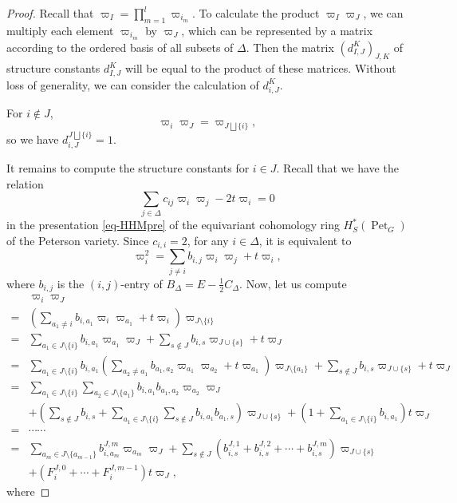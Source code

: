 \documentclass[11pt, letterpaper]{amsart}
\numberwithin{equation}{section}
\DeclareMathOperator{\Pet}{Pet}
\begin{document}
\begin{proof}
Recall that $\varpi_I=\prod_{m=1}^l\varpi_{i_m}$. To calculate the product $\varpi_I\varpi_J$, we can multiply each element $\varpi_{i_m}$ by $\varpi_J$, which can be represented by a matrix according to the ordered basis of all subsets of $\Delta$. Then the matrix $(d^K_{I, J})_{J, K}$ of structure constants $d_{I,J}^K$ will be equal to the product of these matrices. Without loss of generality, we can consider the calculation of $d_{i,J}^K$.

For $i\notin J$,
\[ \varpi_{i}\varpi_{J}=\varpi_{J\bigsqcup\{i\} },
    \]
so we have $d_{i,J}^{J\bigsqcup\{i\}}=1$.

    It remains to compute the structure constants for $i\in J$.
    Recall that we have the relation 
    $$\sum_{j\in \Delta}c_{ij}\varpi_i\varpi_j-2t\varpi_i=0$$ 
    in the presentation \eqref{eq-HHMpre} of the equivariant cohomology ring $H_S^*(\Pet_G)$ of the Peterson variety. Since $c_{i,i}=2$, for any $i\in \Delta$, it is equivalent to
    \[ \varpi_i^2=\sum_{j \neq i}b_{i,j} \varpi_i\varpi_j+t\varpi_i,
    \]
    where $b_{i, j}$ is the $(i,j)$-entry of  $B_{\Delta}=E-\frac{1}{2}C_\Delta$. Now, let us compute
\begin{equation}\label{eq-computation}
\begin{aligned}
&\varpi_i\varpi_{J}\\=
&\left(\sum_{a_1\neq i}b_{i,a_1}\varpi_i\varpi_{a_1}+t\varpi_i\right)\varpi_{J\setminus\{i\}} \\
        =&\sum_{a_1\in J\setminus\{i\}}b_{i,a_1}\varpi_{a_1}\varpi_{J}+\sum_{s\notin J}b_{i,s}\varpi_{J\cup\{s\}} +t\varpi_J\\
        =&\sum_{a_1\in J\setminus\{i\}} b_{i,a_1}\left(\sum_{a_2\neq a_1}b_{a_1,a_2}\varpi_{a_1}\varpi_{a_2}+t\varpi_{a_1}\right)\varpi_{J\setminus\{a_1\}}+\sum_{s\notin J}b_{i,s}\varpi_{J\cup\{s\}}+t\varpi_J\\
        =&\sum_{a_1\in J\setminus\{i\}}\sum_{a_2\in J\setminus\{a_1\}}b_{i,a_1}b_{a_1,a_2}\varpi_{a_2}\varpi_J\\&+\left(\sum_{s\notin J}b_{i, s}+\sum_{a_1\in J\setminus\{i\}}\sum_{s\notin J}b_{i,a_1}b_{a_1,s} \right)\varpi_{J\cup\{s\}}+\left(1+\sum_{a_1\in J\setminus\{i\}}b_{i,a_1}\right)t\varpi_J \\
        =&\cdots\cdots \\
        =&\sum_{a_m\in J\setminus\{a_{m-1}\}}b_{i,a_m}^{J,m}\varpi_{a_m}\varpi_J+\sum_{s\notin J}\left(b_{i,s}^{J,1}+b_{i,s}^{J,2}+\cdots+b_{i,s}^{J,m}\right)\varpi_{J\cup\{s\}}\\
        &+(F_i^{J,0}+\cdots+F_i^{J,m-1})t\varpi_J,
\end{aligned}
\end{equation}
where 


\end{proof}
\end{document}
